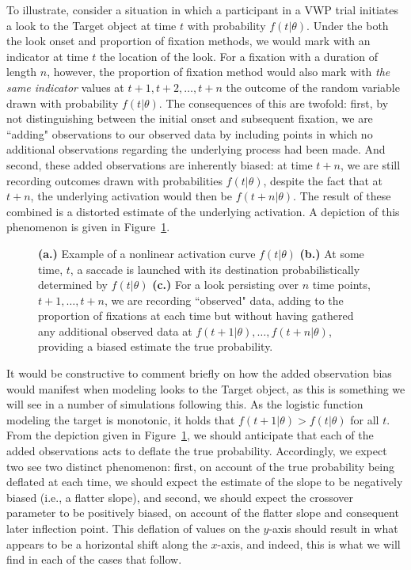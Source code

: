 To illustrate, consider a situation in which a participant in a VWP trial initiates a look to the Target object at time $t$ with probability $f(t|\theta)$. Under the both the look onset and proportion of fixation methods, we would mark with an indicator at time $t$ the location of the look. For a fixation with a duration of length $n$, however, the proportion of fixation method would also mark with \textit{the same indicator} values at $t+1, t+2, \dots, t+n$ the outcome of the random variable drawn with probability $f(t|\theta)$. The consequences of this are twofold: first, by not distinguishing between the initial onset and subsequent fixation, we are ``adding" observations to our observed data by including points in which no additional observations regarding the underlying process had been made. And second, these added observations are inherently biased: at time $t+n$, we are still recording outcomes drawn with probabilities $f(t|\theta)$, despite the fact that at $t+n$, the underlying activation would then be $f(t+n | \theta)$. The result of these combined is a distorted  estimate of the underlying activation. A depiction of this phenomenon is given in Figure~\ref{fig:folly_of_fixation}.


\begin{figure}[H]
    \centering
    \caption{ \textbf{(a.)} Example of a nonlinear activation curve $f(t|\theta)$ \textbf{(b.)} At some time, $t$, a saccade is launched with its destination probabilistically determined by $f(t|\theta)$ \textbf{(c.)} For a look persisting over $n$ time points, $t+1, \dots, t+n$, we are recording ``observed" data, adding to the proportion of fixations at each time but without having gathered any additional observed data at $f(t+1 | \theta), \dots,f(t+n | \theta)$, providing a biased estimate the true probability. }
\label{fig:folly_of_fixation}
\end{figure}

It would be constructive to comment briefly on how the added observation bias would manifest when modeling looks to the Target object, as this is something we will see in a number of simulations following this. As the logistic function modeling the target is monotonic, it holds that $f(t+1|\theta) > f(t | \theta)$ for all $t$. From the depiction given in Figure~\ref{fig:folly_of_fixation}, we should anticipate that each of the added observations acts to deflate the true probability. Accordingly, we expect two see two distinct phenomenon: first, on account of the true probability being deflated at each time, we should expect the estimate of the slope to be negatively biased (i.e., a flatter slope), and second, we should expect the crossover parameter to be positively biased, on account of the flatter slope and consequent later inflection point. This deflation of values on the $y$-axis should result in what appears to be a horizontal shift along the $x$-axis, and indeed, this is what we will find in each of the cases that follow.

